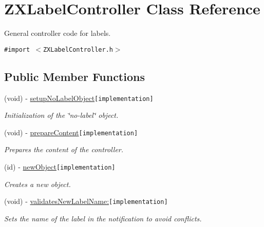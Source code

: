 \hypertarget{interface_z_x_label_controller}{
\section{ZXLabelController Class Reference}
\label{interface_z_x_label_controller}
}
General controller code for labels.  


{\tt \#import $<$ZXLabelController.h$>$}

\subsection*{Public Member Functions}
\begin{CompactItemize}
\item 
(void) - \hyperlink{interface_z_x_label_controller_30de273ba04ff277ed54ad72762febbf}{setupNoLabelObject}{\tt  \mbox{[}implementation\mbox{]}}
\begin{CompactList}\small\item\em Initialization of the \char`\"{}no-label\char`\"{} object. \item\end{CompactList}\item 
(void) - \hyperlink{interface_z_x_label_controller_4ea2295ba1a5c882725dade2e2bc3e34}{prepareContent}{\tt  \mbox{[}implementation\mbox{]}}
\begin{CompactList}\small\item\em Prepares the content of the controller. \item\end{CompactList}\item 
(id) - \hyperlink{interface_z_x_label_controller_08a73cbea0039d0c0e84d41af8bafb7d}{newObject}{\tt  \mbox{[}implementation\mbox{]}}
\begin{CompactList}\small\item\em Creates a new object. \item\end{CompactList}\item 
(void) - \hyperlink{interface_z_x_label_controller_50d77144c9045b2f125604b699d474fb}{validatesNewLabelName:}{\tt  \mbox{[}implementation\mbox{]}}
\begin{CompactList}\small\item\em Sets the name of the label in the notification to avoid conflicts. \item\end{CompactList}\item 

\end{CompactItemize}
